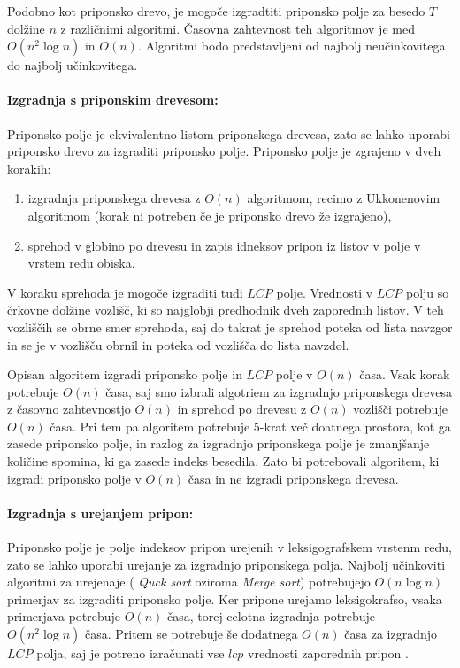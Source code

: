Podobno kot priponsko drevo, je mogoče izgradtiti priponsko polje za besedo $T$ dolžine $n$ z različnimi algoritmi. Časovna zahtevnost teh algoritmov je med $O(n^2\log{n})$ in $O(n)$. Algoritmi bodo predstavljeni od najbolj neučinkovitega do najbolj učinkovitega.

\paragraph{Izgradnja s priponskim drevesom:}
Priponsko polje je ekvivalentno listom priponskega drevesa, zato se lahko uporabi priponsko drevo za izgraditi priponsko polje. Priponsko polje je zgrajeno v dveh korakih:
\begin{enumerate}
    \item izgradnja priponskega drevesa z $O(n)$ algoritmom, recimo z Ukkonenovim algoritmom (korak ni potreben če je priponsko drevo že izgrajeno),
    \item sprehod v globino po drevesu in zapis idneksov pripon iz listov v polje v vrstem redu obiska.
\end{enumerate}
V koraku sprehoda je mogoče izgraditi tudi $LCP$ polje. Vrednosti v $LCP$ polju so črkovne dolžine vozlišč, ki so najglobji predhodnik dveh zaporednih listov. V teh vozliščih se obrne smer sprehoda, saj do takrat je sprehod poteka od lista navzgor in se je v vozlišču obrnil in poteka od vozlišča do lista navzdol.

Opisan algoritem izgradi priponsko polje in $LCP$ polje v $O(n)$ časa. Vsak korak potrebuje $O(n)$ časa, saj smo izbrali algotriem za izgradnjo priponskega drevesa z časovno zahtevnostjo $O(n)$ in sprehod po drevesu z $O(n)$ vozlišči potrebuje $O(n)$ časa. Pri tem pa algoritem potrebuje 5-krat več doatnega prostora, kot ga zasede priponsko polje, in razlog za izgradnjo priponskega polje je zmanjšanje količine spomina, ki ga zasede indeks besedila. Zato bi potrebovali algoritem, ki izgradi priponsko polje v $O(n)$ časa in ne izgradi priponskega drevesa.

\paragraph{Izgradnja s urejanjem pripon:}
Priponsko polje je polje indeksov pripon urejenih v leksigografskem vrstenm redu, zato se lahko uporabi urejanje za izgradnjo priponskega polja. Najbolj učinkoviti algoritmi za urejenaje ( \textit{Quck sort} oziroma  \textit{Merge sort}) potrebujejo $O(n\log{n})$ primerjav za izgraditi priponsko polje. Ker pripone urejamo leksigokrafso, vsaka primerjava potrebuje $O(n)$ časa, torej celotna izgradnja potrebuje $O(n^2\log{n})$ časa. Pritem se potrebuje še dodatnega $O(n)$ časa za izgradnjo $LCP$ polja, saj je potreno izračunati vse $lcp$ vrednosti zaporednih pripon \cite{Kasai2001}.

